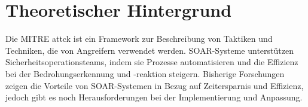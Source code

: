 \newpage
\section{Theoretischer Hintergrund
} \label{latexDetails}
Die MITRE \ac{attck} ist ein Framework zur Beschreibung von Taktiken und Techniken, die von Angreifern verwendet werden. SOAR-Systeme unterstützen Sicherheitsoperationsteams, indem sie Prozesse automatisieren und die Effizienz bei der Bedrohungserkennung und -reaktion steigern. Bisherige Forschungen zeigen die Vorteile von SOAR-Systemen in Bezug auf Zeitersparnis und Effizienz, jedoch gibt es noch Herausforderungen bei der Implementierung und Anpassung.